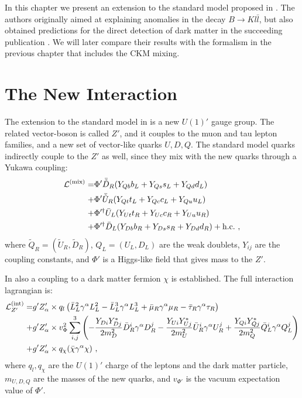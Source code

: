 In this chapter we present an extension to the standard model proposed in \cite{InColour}. The authors originally aimed at explaining anomalies in the decay $B\rightarrow Kl\bar{l}$, but also obtained predictions for the direct detection of dark matter in the succeeding publication \cite{Z}. We will later compare their results with the formalism in the previous chapter that includes the CKM mixing.

\section{The New Interaction}
The extension to the standard model in \cite{InColour} is a new $U(1)'$ gauge group. The related vector-boson is called $Z'$, and it couples to the muon and tau lepton families, and a new set of vector-like quarks $U,D,Q$. The standard model quarks indirectly couple to the $Z'$ as well, since they mix with the new quarks through a Yukawa coupling:
\begin{align}
	\mathcal{L}^{(\text{mix})} = &\Phi' \bar{\tilde{D}}_R(Y_{Qb}b_L + Y_{Qs}s_L + Y_{Qd}d_L)\notag \\
	+ &\Phi'\bar{\tilde{U}}_R(Y_{Qt}t_L + Y_{Qc}c_L + Y_{Qu}u_L)\notag \\
	+ &\Phi'^\dagger\bar{U}_L(Y_{Ut}t_R + Y_{Uc}c_R + Y_{Uu}u_R)\notag \\
	+ &\Phi'^\dagger\bar{D}_L(Y_{Db}b_R + Y_{Ds}s_R + Y_{Dd}d_R) +\text{h.c.} \ ,
\end{align}
where $\tilde{Q}_R = (\tilde{U}_R,\tilde{D}_R)$, $Q_L = (U_L,D_L)$ are the weak doublets, $Y_{ij}$ are the coupling constants, and $\Phi'$ is a Higgs-like field that gives mass to the $Z'$.


In \cite{Z} also a coupling to a dark matter fermion $\chi$ is established. The full interaction lagrangian is:
\begin{align}
	\mathcal{L}^{(\text{int})}_{Z'} = &g'Z_\alpha'\times q_l\left(\bar{L}_L^2\gamma^\alpha L_L^2 - \bar{L}_L^3\gamma^\alpha L_L^3 + \bar{\mu}_R\gamma^\alpha\mu_R-\bar{\tau}_R\gamma^\alpha\tau_R\right)\notag \\
	+&g'Z_\alpha'\times v_\Phi^2\sum_{i,j}^3\left(-\frac{Y_{Di}Y^*_{Dj}}{2m_D^2}\bar{D}_R^i\gamma^\alpha D_R^j - \frac{Y_{Ui}Y^*_{Uj}}{2m_U^2}\bar{U}_R^i\gamma^\alpha U_R^j + \frac{Y_{Qi}Y_{Qj}^*}{2m_Q^2}\bar{Q}_L^i\gamma^\alpha Q_L^j\right)\notag \\
	+&g'Z_\alpha'\times q_\chi(\bar{\chi}\gamma^\alpha\chi) \ ,
\end{align}
where $q_l,q_\chi$ are the $U(1)'$ charge of the leptons and the dark matter particle, $m_{U,D,Q}$ are the masses of the new quarks, and $v_{\Phi'}$ is the vacuum expectation value of $\Phi'$.



